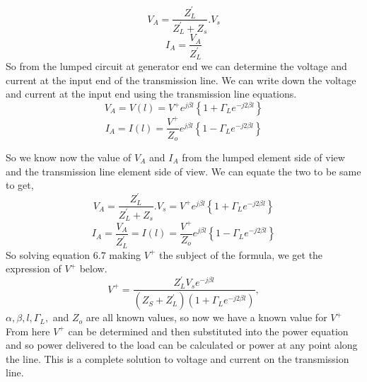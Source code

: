 \begin{equation}
V_A = \frac{Z^'_L}{Z^{'}_L + Z_s} . V_s
\end{equation}
\begin{equation}
I_A = \frac{V_A}{Z^{'}_L}
\end{equation} 
So from the lumped circuit at generator end we can determine the voltage and current at the input end of the transmission line. We can write down the voltage and current at the input end using the transmission line equations.
\begin{equation*} 
V_A= V(l) = V^+ e^{j\beta l} \left\lbrace 1 + \Gamma_L e^{-j2\beta l} \right\rbrace 
\end{equation*} 
\begin{equation*}
I_A = I(l) = \frac{V^+}{Z_o} e^{j\beta l} \left\lbrace 1 - \Gamma_L e^{-j2\beta l} \right\rbrace
\end{equation*}

So we know now the value of $V_A$ and $I_A$ from the lumped element side of view and the transmission line element side of view. We can equate the two to be same to get,
\begin{equation} 
V_A = \frac{Z^{'}_L}{Z^{'}_L + Z_s} . V_s = V^+ e^{j\beta l} \left\lbrace 1 + \Gamma_L e^{-j2\beta l} \right\rbrace 
\end{equation}
\begin{equation}
I_A = \frac{V_A}{Z^{'}_L} = I(l) = \frac{V^+}{Z_o} e^{j\beta l} \left\lbrace 1 - \Gamma_L e^{-j2\beta l} \right\rbrace
\end{equation}
So solving equation $6.7$ making $V^{+}$ the subject of the formula, we get the expression of $V^+$ below. 
\begin{equation} 
V^+ = \frac{Z^{'}_L V_s e^{-j\beta l}}{(Z_S + Z^{'}_L)(1 + \Gamma_L e^{-j2\beta l })}, 
\end{equation}
$\alpha, \beta , l  , \Gamma_L,$ and $Z_o$ are all known values, so now we have a known value for $V^+$\\

From here $V^+$ can be determined and then substituted into the power equation and so power delivered to the load can be calculated or power at any point along the line. This is a complete solution to voltage and current on the transmission line.

